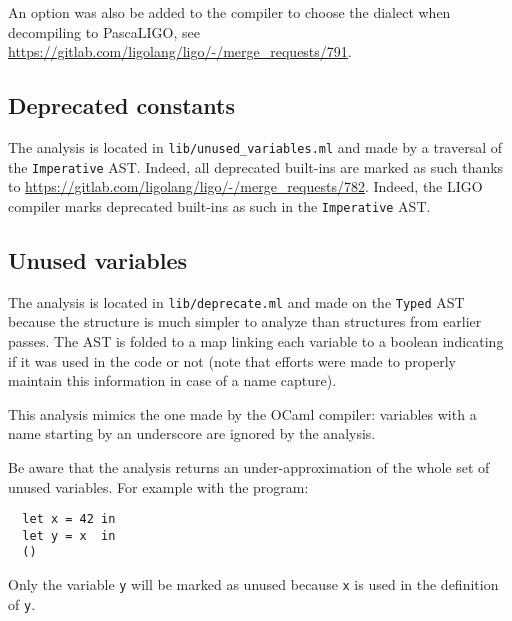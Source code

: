 \documentclass[10pt,a4paper]{article}
\begin{document}
An option was also be added to the compiler to choose the dialect when
decompiling to PascaLIGO, see
\url{https://gitlab.com/ligolang/ligo/-/merge_requests/791}.

\subsection{Deprecated constants}

The analysis is located in \verb|lib/unused_variables.ml| and made by
a traversal of the \verb|Imperative| AST. Indeed, all deprecated
built-ins are marked as such thanks to
\url{https://gitlab.com/ligolang/ligo/-/merge_requests/782}.
Indeed, the LIGO compiler marks deprecated built-ins as such in the
\verb|Imperative| AST.

\subsection{Unused variables}

The analysis is located in \verb|lib/deprecate.ml| and made on the
\verb|Typed| AST because the structure is much simpler to analyze than
structures from earlier passes. The AST is folded to a map linking
each variable to a boolean indicating if it was used in the code or
not (note that efforts were made to properly maintain this information
in case of a name capture).

This analysis mimics the one made by the OCaml compiler: variables
with a name starting by an underscore are ignored by the analysis.

Be aware that the analysis returns an under-approximation of the whole
set of unused variables.  For example with the program:
\begin{verbatim}
  let x = 42 in
  let y = x  in
  ()
\end{verbatim}

Only the variable \verb|y| will be marked as unused because
\verb|x| is used in the definition of \verb|y|.


{}
\end{document}
